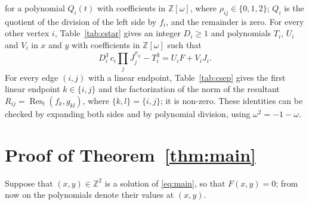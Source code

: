\documentclass[11pt]{article}
\newcommand{\Z}{\mathbb{Z}}
\begin{document}
for a polynomial $Q_i(t)$ with coefficients in $\Z[\omega]$, where $\rho_{ij}\in\{0,1,2\}$; $Q_i$ is the quotient of the division of the left side by $f_i$, and the remainder is zero.
For every other vertex $i$, Table~\ref{tab:cstar} gives an integer $D_i\geq1$ and polynomials $T_i$, $U_i$ and $V_i$ in $x$ and $y$ with coefficients in $\Z[\omega]$ such that
\begin{equation}\label{eq:cstar}
D_i^3\,c_i\prod_jJ_j^{\rho_{ij}}-T_i^3=U_iF+V_iJ_i.
\end{equation}
For every edge $(i,j)$ with a linear endpoint, Table~\ref{tab:csep} gives the first linear endpoint $k\in\{i,j\}$ and the factorization of the norm of the resultant $R_{ij}=\operatorname{Res}_t(f_k,g_{kl})$, where $\{k,l\}=\{i,j\}$; it is non-zero.
These identities can be checked by expanding both sides and by polynomial division, using $\omega^2=-1-\omega$.

\section{Proof of Theorem~\ref{thm:main}}

Suppose that $(x,y)\in\Z^2$ is a solution of \eqref{eq:main}, so that $F(x,y)=0$; from now on the polynomials denote their values at $(x,y)$.
\end{document}
